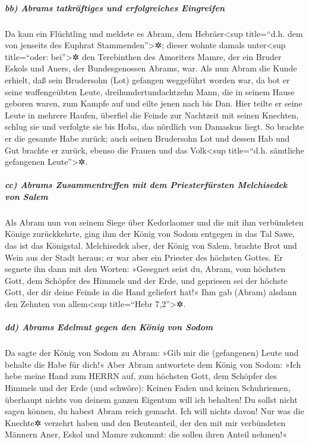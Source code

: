 \hypertarget{bb-abrams-tatkruxe4ftiges-und-erfolgreiches-eingreifen}{%
\subparagraph{bb) Abrams tatkräftiges und erfolgreiches
Eingreifen}\label{bb-abrams-tatkruxe4ftiges-und-erfolgreiches-eingreifen}}

 Da kam ein Flüchtling und meldete es Abram, dem
Hebräer\textless sup title=``d.h. dem von jenseits des Euphrat
Stammenden''\textgreater✲; dieser wohnte damals unter\textless sup
title=``oder: bei''\textgreater✲ den Terebinthen des Amoriters Mamre,
der ein Bruder Eskols und Aners, der Bundesgenossen Abrams, war.
 Als nun Abram die Kunde erhielt, daß sein Brudersohn
(Lot) gefangen weggeführt worden war, da bot er seine waffengeübten
Leute, dreihundertundachtzehn Mann, die in seinem Hause geboren waren,
zum Kampfe auf und eilte jenen nach bis Dan.  Hier teilte
er seine Leute in mehrere Haufen, überfiel die Feinde zur Nachtzeit mit
seinen Knechten, schlug sie und verfolgte sie bis Hoba, das nördlich von
Damaskus liegt.  So brachte er die gesamte Habe zurück;
auch seinen Brudersohn Lot und dessen Hab und Gut brachte er zurück,
ebenso die Frauen und das Volk\textless sup title=``d.h. sämtliche
gefangenen Leute''\textgreater✲.

\hypertarget{cc-abrams-zusammentreffen-mit-dem-priesterfuxfcrsten-melchisedek-von-salem}{%
\subparagraph{cc) Abrams Zusammentreffen mit dem Priesterfürsten
Melchisedek von
Salem}\label{cc-abrams-zusammentreffen-mit-dem-priesterfuxfcrsten-melchisedek-von-salem}}

 Als Abram nun von seinem Siege über Kedorlaomer und die
mit ihm verbündeten Könige zurückkehrte, ging ihm der König von Sodom
entgegen in das Tal Sawe, das ist das Königstal. 
Melchisedek aber, der König von Salem, brachte Brot und Wein aus der
Stadt heraus; er war aber ein Priester des höchsten Gottes.
 Er segnete ihn dann mit den Worten: »Gesegnet seist du,
Abram, vom höchsten Gott, dem Schöpfer des Himmels und der Erde,
 und gepriesen sei der höchste Gott, der dir deine Feinde
in die Hand geliefert hat!« Ihm gab (Abram) alsdann den Zehnten von
allem\textless sup title=``Hebr 7,2''\textgreater✲.

\hypertarget{dd-abrams-edelmut-gegen-den-kuxf6nig-von-sodom}{%
\subparagraph{dd) Abrams Edelmut gegen den König von
Sodom}\label{dd-abrams-edelmut-gegen-den-kuxf6nig-von-sodom}}

 Da sagte der König von Sodom zu Abram: »Gib mir die
(gefangenen) Leute und behalte die Habe für dich!«  Aber
Abram antwortete dem König von Sodom: »Ich hebe meine Hand zum HERRN
auf, zum höchsten Gott, dem Schöpfer des Himmels und der Erde (und
schwöre):  Keinen Faden und keinen Schuhriemen, überhaupt
nichts von deinem ganzen Eigentum will ich behalten! Du sollst nicht
sagen können, du habest Abram reich gemacht.  Ich will
nichts davon! Nur was die Knechte✲ verzehrt haben und den Beuteanteil,
der den mit mir verbündeten Männern Aner, Eskol und Mamre zukommt: die
sollen ihren Anteil nehmen!«

